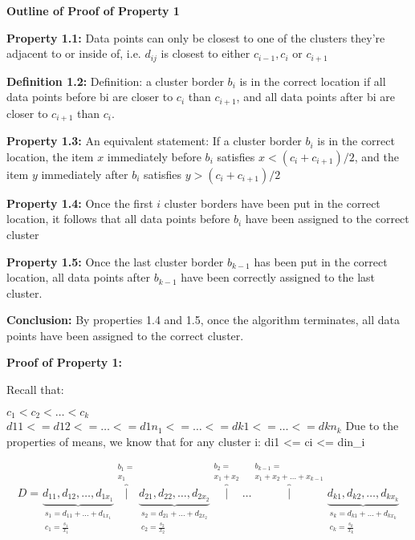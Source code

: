\documentclass[conference]{IEEEtran}
\begin{document}
\textbf{Outline of Proof of Property 1}

\textbf{Property 1.1:}
Data points can only be closest to one of the clusters they’re adjacent to or inside of, i.e. $d_{ij}$ is closest to either $c_{i-1}, c_i$ or $c_{i+1}$

\textbf{Definition 1.2:}
Definition: a cluster border $b_i$ is in the correct location if all data points before bi are closer to $c_i$ than $c_{i+1}$, and all data points after bi are closer to $c_{i+1}$ than $c_i$.

\textbf{Property 1.3:}
An equivalent statement: If a cluster border $b_i$ is in the correct location, the item $x$ immediately before $b_i$ satisfies $x < (c_i+c_{i+1})/2$, and the item $y$ immediately after $b_i$ satisfies $y > (c_i+c_{i+1})/2$

\textbf{Property 1.4:}
Once the first $i$ cluster borders have been put in the correct location, it follows that all data points before $b_i$ have been assigned to the correct cluster

\textbf{Property 1.5:}
Once the last cluster border $b_{k-1}$ has been put in the correct location, all data points after $b_{k-1}$ have been correctly assigned to the last cluster.

\textbf{Conclusion:}
By properties 1.4 and 1.5, once the algorithm terminates, all data points have been assigned to the correct cluster.


\textbf{Proof of Property 1:}

Recall that:

$c_1 < c_2 < \dots < c_k$
$d11 <= d12 <= \dots <= d1n_1 <= … <= dk1 <= … <= dkn_k$
Due to the properties of means, we know that for any cluster i:
di1 <= ci <= din_i


$$
D=
\underbrace{d_{11}, d_{12}, \dots, d_{1x_1}}_{\substack{s_1 = d_{11} + \dots + d_{1x_1} \\  c_1 = \frac{s_1}{x_1}}}
\overbrace{|}^{\substack{b_1 = \\ x_1}}
\underbrace{d_{21}, d_{22}, \dots, d_{2x_2}}_{\substack{s_2 = d_{21} + \dots + d_{2x_2} \\  c_2 = \frac{s_2}{x_2}}}
\overbrace{|}^{\substack{b_2 = \\ x_1 + x_2}}
\dots
\overbrace{|}^{\substack{b_{k-1} = \\ x_1 + x_2 + \dots + x_{k-1}}}
\underbrace{d_{k1}, d_{k2}, \dots, d_{kx_k}}_{\substack{s_k = d_{k1} + \dots + d_{kx_k} \\  c_k = \frac{s_k}{x_k}}}
$$
\end{document}
